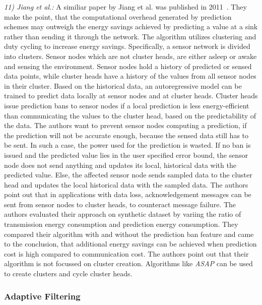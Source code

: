 \textit{11) Jiang et al.:}
A similiar paper by Jiang et al. was published in
2011~\cite{jiang2011prediction}. They make the point, that the computational
overhead generated by prediction schemes may outweigh the energy savings
achieved by predicting a value at a sink rather than sending it through the
network. The algorithm utilizes clustering and duty cycling to increase energy
savings. Specifically, a sensor network is divided into clusters. Sensor nodes
which are not cluster heads, are either asleep or awake and sensing the
environment. Sensor nodes hold a history of predicted or sensed data points,
while cluster heads have a history of the values from all sensor nodes in their
cluster. Based on the historical data, an autoregressive model can be trained
to predict data locally at sensor nodes and at cluster heads. Cluster heads
issue prediction bans to sensor nodes if a local prediction is less
energy-efficient than communicating the values to the cluster head, based on
the predictability of the data. The authors want to prevent sensor nodes
computing a prediction, if the prediction will not be accurate enough, because
the sensed data still has to be sent. In such a case, the power used for the
prediction is wasted. If no ban is issued and the predicted value lies in the
user specified error bound, the sensor node does not send anything and updates
its local, historical data with the predicted value. Else, the affected sensor
node sends sampled data to the cluster head and updates the local historical
data with the sampled data. The authors point out that in applications with
data loss, acknowledgement messages can be sent from sensor nodes to cluster
heads, to counteract message failure.
The authors evaluated their approach on synthetic dataset by variing the ratio
of transmission energy consumption and prediction energy consumption. They
compared their algorithm with and without the prediction ban feature and came
to the conclusion, that additional energy savings can be achieved when
prediction cost is high compared to communication cost. The authors point out
that their algorithm is not focussed on cluster creation. Algorithms like
\textit{ASAP} can be used to create clusters and cycle cluster heads.

\subsubsection{Adaptive Filtering}
\label{sec:Adaptive Filtering}

